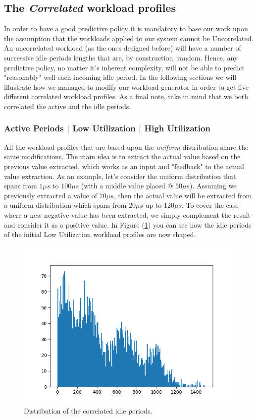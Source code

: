 \documentclass[a4paper]{article}
\begin{document}
    \subsection{The \emph{Correlated} workload profiles}
        In order to have a good predictive policy it is mandatory to base our work upon the assumption that the workloads applied to our system cannot be Uncorrelated. An uncorrelated workload (as the ones designed before) will have a number of successive idle periods lengths that are, by construction, random. Hence, any predictive policy, no matter it's inherent complexity, will not be able to predict "reasonably" well each incoming idle period. In the following sections we will illustrate how we managed to modify our workload generator in order to get five different correlated workload profiles.
        As a final note, take in mind that we both correlated the active and the idle periods.

        \subsubsection{Active Periods | Low Utilization | High Utilization}
            All the workload profiles that are based upon the \emph{uniform} distribution share the same modifications. The main idea is to extract the actual value based on the previous value extracted, which works as an input and "feedback" to the actual value extraction.
            As an example, let's consider the uniform distribution that spans from $1 \mu s$ to $100 \mu s$ (with a middle value placed @ $50 \mu s$).
            Assuming we previously extracted a value of $70 \mu s$, then the actual value will be extracted from a uniform distribution which spans from $20 \mu s$ up to $120 \mu s$. To cover the case where a new negative value has been extracted, we simply complement the result and consider it as a positive value.
            In Figure (\ref{fig:IdleCorrelated1}) you can see how the idle periods of the initial Low Utilization workload profiles are now shaped.

            \begin{figure}[htp]
                \centering
                \includegraphics[width=0.35 \columnwidth]{./screenshots/IdleCorrelated1.png}
                \caption{
                        \label{fig:IdleCorrelated1}
                        Distribution of the correlated idle periods.
                }
            \end{figure}
\end{document}
